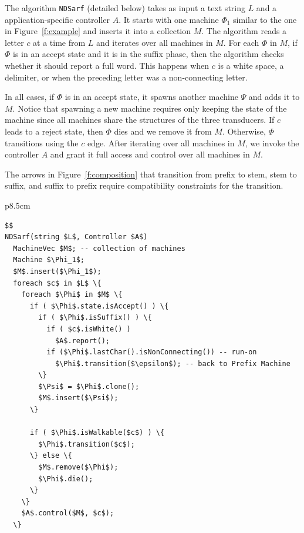 \documentclass[a4,12pt]{report}
\newcommand{\CodeIn}[1]{{\small\texttt{#1}}}
\begin{document}

\begin{figure}[tb]
\end{figure}

The algorithm \CodeIn{NDSarf} (detailed below)
takes as input a text string $L$ and a application-specific controller
$A$. 
It starts with one machine $\Phi_1$ similar to the one in 
Figure~\ref{f:example} and inserts it into a collection
$M$. 
The algorithm reads a letter $c$ at a time from $L$
and iterates over all machines in $M$. 
For each $\Phi$ in $M$,
if $\Phi$ is in an accept state and it is in the suffix
phase, then the algorithm checks whether it should report
a full word. 
This happens when $c$ is a white space, a delimiter, 
or when the preceding letter %
was a non-connecting letter. 

In all cases, if $\Phi$ is in an accept state, 
it spawns another machine $\Psi$ and adds it to $M$. 
Notice that spawning a new machine requires only keeping
the state of the machine since all machines share the
structures of the three transducers.
If $c$ leads to a reject state, then $\Phi$ dies 
and we remove it from $M$. 
Otherwise, $\Phi$ transitions using the $c$ edge.
After iterating over all machines in $M$, we invoke the 
controller $A$
and grant it full access and control over
all machines in $M$. 

The arrows in Figure~\ref{f:composition} that transition
from prefix to stem, stem to suffix, and suffix to prefix
require compatibility constraints for 
the transition.

\begin{table}[tb]
\centering
\begin{tabular} {p{8.5cm}}
\begin{Verbatim}[fontsize=\relsize{-2},
frame=topline,framesep=4mm,label=\fbox{NDSarf algorithm},
commandchars=\\\{\}, codes={\catcode`$=3\catcode`_=8}] 
$$
NDSarf(string $L$, Controller $A$) 
  MachineVec $M$; -- collection of machines
  Machine $\Phi_1$;
  $M$.insert($\Phi_1$);
  foreach $c$ in $L$ \{
    foreach $\Phi$ in $M$ \{
      if ( $\Phi$.state.isAccept() ) \{
        if ( $\Phi$.isSuffix() ) \{
          if ( $c$.isWhite() )  
            $A$.report();
          if ($\Phi$.lastChar().isNonConnecting()) -- run-on
            $\Phi$.transition($\epsilon$); -- back to Prefix Machine
        \}
        $\Psi$ = $\Phi$.clone();
        $M$.insert($\Psi$); 
      \}

      if ( $\Phi$.isWalkable($c$) ) \{
        $\Phi$.transition($c$);
      \} else \{
        $M$.remove($\Phi$);
        $\Phi$.die();
      \} 
    \} 
    $A$.control($M$, $c$); 
  \}
\end{Verbatim}
\end{tabular}
\label{a:ndsarf}
\end{table}
\end{document}
